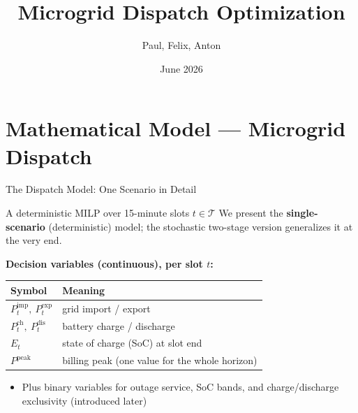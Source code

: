\documentclass[aspectratio=169]{beamer}
\title{Microgrid Dispatch Optimization}
\author{Paul, Felix, Anton}
\institute[]{QC Praktikum}
\date{June 2026}
\begin{document}
\section{Mathematical Model — Microgrid Dispatch}

\begin{frame}{The Dispatch Model: One Scenario in Detail}
\begin{block}{A deterministic MILP over 15-minute slots $t \in \mathcal{T}$}
    We present the \textbf{single-scenario} (deterministic) model; the
    stochastic two-stage version generalizes it at the very end.
\end{block}

\textbf{Decision variables (continuous), per slot $t$:}
\begin{center}\small
\begin{tabular}{ll}
\toprule
Symbol & Meaning \\
\midrule
$P^{\text{imp}}_t,\ P^{\text{exp}}_t$ & grid import / export \\
$P^{\text{ch}}_t,\ P^{\text{dis}}_t$ & battery charge / discharge \\
$E_t$ & state of charge (SoC) at slot end \\
$P^{\text{peak}}$ & billing peak (one value for the whole horizon) \\
\bottomrule
\end{tabular}
\end{center}

\begin{itemize}\footnotesize
    \item Plus binary variables for outage service, SoC bands, and
          charge/discharge exclusivity (introduced later)
\end{itemize}
\end{frame}
\end{document}
